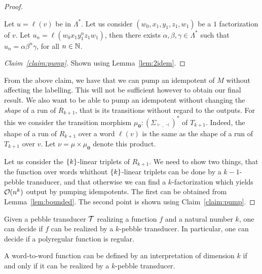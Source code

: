 \begin{proof}
    \begin{claim}\label{claim:pump}
        Let $u=\ell(v)$ be in $ \Lambda^*$.
        Let us consider $(w_0,x_1,y_1,z_1,w_1)$ be a $1$ factorization of $v$.
        Let $u_n=\ell(w_0x_1y_1^nz_1w_1)$, then there exists $\alpha,\beta,\gamma\in \Lambda^*$ such that $u_n=\alpha\beta^n\gamma$, for all $n\in \mathbb{N}$.
    \end{claim}
\begin{proof}[Claim~\ref{claim:pump}]
    Shown using Lemma~\ref{lem:2idem}.
\end{proof}
From the above claim, we have that we can pump an idempotent of $M$ without affecting the labelling.
This will not be sufficient however to obtain our final result. We also want to be able to pump an idempotent without changing the \emph{shape} of a run of $R_{k+1}$, that is its transitions without regard to the outputs.
For this we consider the transition morphism $\mu_{\mathbf 0}:(\Sigma_{\vdash,\dashv})^*$ of $T_{k+1}$. Indeed, the shape of a run of $R_{k+1}$ over a word $\ell(v)$ is the same as the shape of a run of $T_{k+1}$ over $v$.
Let $\nu=\mu\times \mu_{\mathbf 0}$ denote this product.

Let us consider the $\{k\}$-linear triplets of $R_{k+1}$.
We need to show two things, that the function over words whithout $\{k\}$-linear triplets can be done by a $k{-}1$-pebble transducer, and that otherwise we can find a $k$-factorization which yields ${\mathcal O}(n^k)$ output by pumping idempotents.
The first can be obtained from Lemma~\ref{lem:bounded}. The second point is shown using Claim~\ref{claim:pump}.
\end{proof}

\begin{theorem}
    Given a pebble transducer ${\mathcal T}$ realizing a function $f$ and a natural number $k$, one can decide if $f$ can be realized by a $k$-pebble transducer. In particular, one can decide if a polyregular function is regular.
\end{theorem}

\begin{corollary}
    A word-to-word function can be defined by an \mso interpretation of dimension $k$ if and only if it can be realized by a $k$-pebble transducer.
\end{corollary}